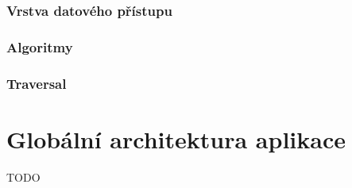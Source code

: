 \subsubsection{Vrstva datového přístupu}
\label{sec:des_data_access}

\subsubsection{Algoritmy}

\subsubsection{Traversal}






\section{Globální architektura aplikace}
TODO




%




